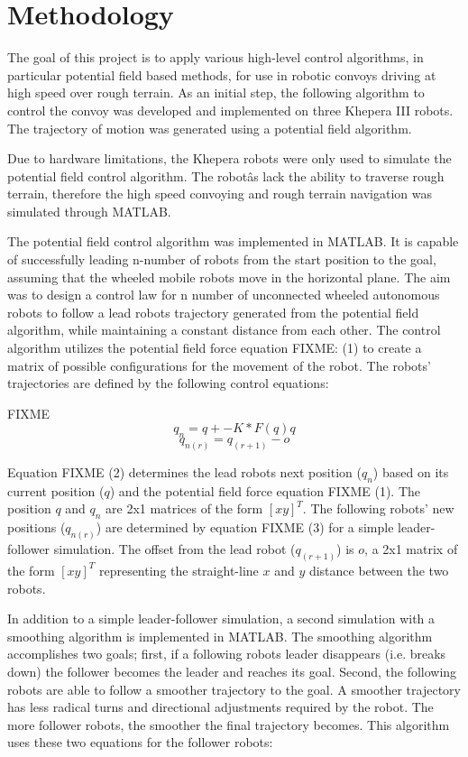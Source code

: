 \chapter{Methodology}
The goal of this project is to apply various high-level control algorithms, in particular potential field based methods, for use in robotic convoys driving at high speed over rough terrain. As an initial step, the following algorithm to control the convoy was developed and implemented on three Khepera III robots. The trajectory of motion was generated using a potential field algorithm.

Due to hardware limitations, the Khepera robots were only used to simulate the potential field control algorithm. The robotâs lack the ability to traverse rough terrain, therefore the high speed convoying and rough terrain navigation was simulated through MATLAB.

The potential field control algorithm was implemented in MATLAB. It is capable of successfully leading n-number of robots from the start position to the goal, assuming that the wheeled mobile robots move in the horizontal plane. The aim was to design a control law for n number of unconnected wheeled autonomous robots to follow a lead robots trajectory generated from the potential field algorithm, while maintaining a constant distance from each other. The control algorithm utilizes the potential field force equation FIXME: (1) to create a matrix of possible configurations for the movement of the robot. The robots' trajectories are defined by the following control equations:

FIXME
$$q_n=q+-K*F(q)q$$
$$q_{n(r)}=q_{(r+1)}-o$$

Equation FIXME (2) determines the lead robots next position ($q_n$) based on its current position ($q$) and the potential field force equation FIXME (1). The position $q$ and $q_n$ are 2x1 matrices of the form $[x y]^T$. The following robots' new positions ($q_{n(r)}$) are determined by equation FIXME (3) for a simple leader-follower simulation. The offset from the lead robot ($q_{(r+1)}$) is $o$, a 2x1 matrix of the form $[x y]^T$ representing the straight-line $x$ and $y$ distance between the two robots.

In addition to a simple leader-follower simulation, a second simulation with a smoothing algorithm is implemented in MATLAB. The smoothing algorithm accomplishes two goals; first, if a following robots leader disappears (i.e. breaks down) the follower becomes the leader and reaches its goal. Second, the following robots are able to follow a smoother trajectory to the goal. A smoother trajectory has less radical turns and directional adjustments required by the robot. The more follower robots, the smoother the final trajectory becomes. This algorithm uses these two equations for the follower robots:
